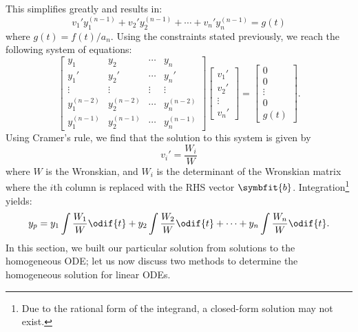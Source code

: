 \documentclass{article}
\begin{document}
This simplifies greatly and results in:
\begin{equation*}
    v_1' y_1^{\left( n-1 \right)} + v_2' y_2^{\left( n-1 \right)} + \cdots + v_n' y_n^{\left( n-1 \right)} = g\left( t \right)
\end{equation*}
where \(g\left( t \right) = f\left( t \right) / a_n\). Using the constraints stated previously, we reach the following
system of equations:
\begin{equation*}
    \begin{bmatrix}
        y_1                      & y_2                      & \cdots & y_n                      \\
        y_1'                     & y_2'                     & \cdots & y_n'                     \\
        \vdots                   & \vdots                   & \vdots & \vdots                   \\
        y_1^{\left( n-2 \right)} & y_2^{\left( n-2 \right)} & \cdots & y_n^{\left( n-2 \right)} \\
        y_1^{\left( n-1 \right)} & y_2^{\left( n-1 \right)} & \cdots & y_n^{\left( n-1 \right)}
    \end{bmatrix}
    \begin{bmatrix}
        v_1'     \\
        v_2'     \\
        \vdots   \\
        v_n'
    \end{bmatrix}
    =
    \begin{bmatrix}
        0      \\
        0      \\
        \vdots \\
        0      \\
        g\left( t \right)
    \end{bmatrix}.
\end{equation*}
Using Cramer's rule, we find that the solution to this system is given by
\begin{equation*}
    v_i' = \frac{W_i}{W}
\end{equation*}
where \(W\) is the Wronskian, and \(W_i\) is the determinant of the Wronskian matrix where the \(i\)th column is replaced with the RHS vector \(\symbfit{b}\).
Integration\footnote{Due to the rational form of the integrand, a closed-form solution may not exist.} yields:
\begin{equation*}
    y_p = y_1 \int \frac{W_1}{W} \odif{t} + y_2 \int \frac{W_2}{W} \odif{t} + \cdots + y_n \int \frac{W_n}{W} \odif{t}.
\end{equation*}
In this section, we built our particular solution from solutions to the homogeneous ODE; let us now discuss two methods to determine the homogeneous solution
for linear ODEs.
\end{document}
